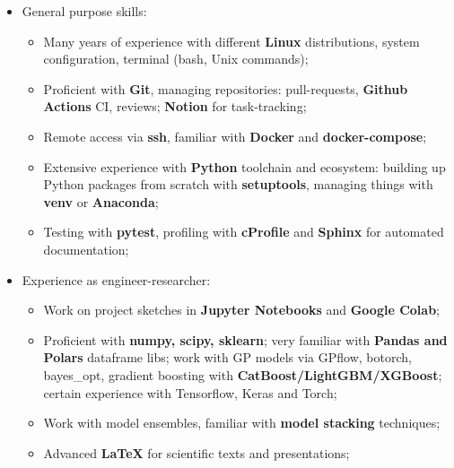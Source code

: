\documentclass[12pt,a4paper,roman]{moderncv}
\begin{document}
 \begin{itemize}
 \item General purpose skills: \newline
    \begin{itemize}
        \item Many years of experience with different \textbf{Linux} distributions, system configuration, terminal (bash, Unix commands); \newline
        \item Proficient with \textbf{Git}, managing repositories: pull-requests,  \textbf{Github Actions} CI, reviews; \textbf{Notion} for task-tracking; \newline
        \item Remote access via \textbf{ssh}, familiar with \textbf{Docker} and \textbf{docker-compose}; \newline
        \item Extensive experience with \textbf{Python} toolchain and ecosystem: building up Python packages from scratch with \textbf{setuptools},
managing things with \textbf{venv} or \textbf{Anaconda}; \newline
        \item Testing with \textbf{pytest}, profiling with \textbf{cProfile} and \textbf{Sphinx} for automated documentation; \newline
    \end{itemize}    
 \item Experience as engineer-researcher:\newline
    \begin{itemize}
        \item Work on project sketches in \textbf{Jupyter Notebooks} and \textbf{Google Colab}; \newline
        \item Proficient with \textbf{numpy, scipy, sklearn}; very familiar with \textbf{Pandas and Polars} dataframe libs;
         work with GP models via GPflow, botorch, bayes\_opt, 
        gradient boosting with \textbf{CatBoost/LightGBM/XGBoost}; certain experience with Tensorflow, Keras and Torch; \newline
        \item Work with model ensembles, familiar with \textbf{model stacking} techniques; \newline
        \item Advanced \textbf{LaTeX} for scientific texts and presentations; \newline
    \end{itemize} 

\end{itemize}
\end{document}

